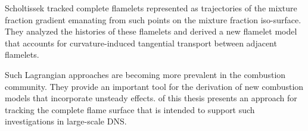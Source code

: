 %
Scholtissek \etal \cite{Scholtissek2017} tracked complete flamelets represented
as trajectories of the mixture fraction gradient emanating from such points on
the mixture fraction iso-surface.
%
They analyzed the histories of these flamelets and derived a new flamelet model
that accounts for curvature-induced tangential transport between adjacent
flamelets.
%

%
Such Lagrangian approaches are becoming more prevalent in the combustion
community.
%
They provide an important tool for the derivation of new combustion models
that incorporate unsteady effects.
%
 of this thesis presents an approach for
tracking the complete flame surface that is intended to support such
investigations in large-scale \ac{DNS}.
%
%

